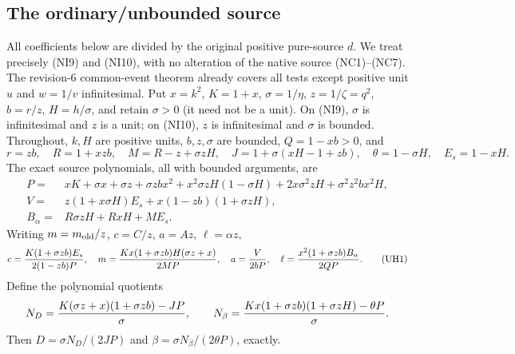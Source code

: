 \subsection{The ordinary/unbounded source}

\label{component:pf7ffa921793c}

\label{pf7ffa921793c:sec:r7-c1-uh}
All coefficients below are divided by the original positive pure-source
$d$. We treat precisely (NI9) and (NI10), with no alteration of the native
source (NC1)--(NC7). The revision-6 common-event theorem already covers
all tests except positive unit $u$ and $w=1/v$ infinitesimal.
Put $x=k^2$, $K=1+x$, $\sigma=1/\eta$, $z=1/\zeta=q^2$,
$b=r/z$, $H=h/\sigma$, and retain $\sigma>0$ (it need not be a unit).
On (NI9), $\sigma$ is infinitesimal and $z$ is a unit; on (NI10),
$z$ is infinitesimal and $\sigma$ is bounded. Throughout, $k,H$ are
positive units, $b,z,\sigma$ are bounded, $Q=1-xb>0$, and
\[
 r=zb,\quad R=1+xzb,\quad M=R-z+\sigma zH,
 \quad J=1+\sigma(xH-1+zb),\quad\theta=1-\sigma H,
 \quad E_s=1-xH.
\]
The exact source polynomials, all with bounded arguments, are
\begin{align*}
 P={}&xK+\sigma x+\sigma z+\sigma zb x^2
 +x^2\sigma zH(1-\sigma H)+2x\sigma^2zH
 +\sigma^2z^2bx^2H,\\
 V={}&z(1+x\sigma H)E_s+x(1-zb)(1+\sigma zH),\\
 B_\alpha={}&R\sigma zH+RxH+ME_s.
\end{align*}
Writing $m=m_{\rm old}/z$, $c=C/z$, $a=Az$, $\ell=\alpha z$,
\[
 c={K(1+\sigma zb)E_s\over2(1-zb)P},\quad
 m={Kx(1+\sigma zb)H(\sigma z+x)\over2MP},\quad
 a={V\over2bP},\quad
 \ell={x^2(1+\sigma zb)B_\alpha\over2QP}.                 \tag{UH1}
\]
Define the polynomial quotients
\[
 N_D={K(\sigma z+x)(1+\sigma zb)-JP\over\sigma},\qquad
 N_\beta={Kx(1+\sigma zb)(1+\sigma zH)-\theta P\over\sigma}.
\]
Then $D=\sigma N_D/(2JP)$ and
$\beta=\sigma N_\beta/(2\theta P)$, exactly.

